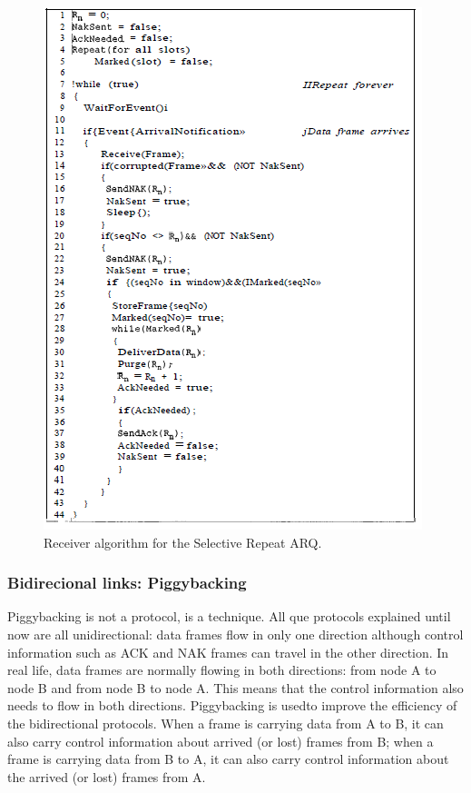 \begin{figure}[H]
\begin{center}
\includegraphics[scale=1]{receiverselective.PNG}  
\caption{Receiver algorithm for the Selective Repeat ARQ.}
\end{center}
\end{figure}

\subsubsection{Bidirecional links: Piggybacking}
Piggybacking is not a protocol, is a technique. All que protocols explained until now are all unidirectional: data frames flow in only one direction although control information such as ACK and NAK frames can travel in the other direction. In real life, data frames are normally flowing in both directions: from node A to node B and from node B to node A. This means that the control information also needs to flow in both directions. Piggybacking is usedto improve the efficiency of the bidirectional protocols. When a frame is carrying data from A to B, it can also carry control information about arrived (or lost) frames from B; when a frame is carrying data from B to A, it can also carry control information about the arrived (or lost) frames from A.

